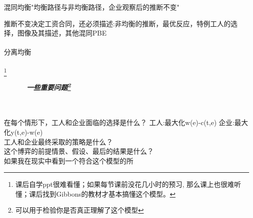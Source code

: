 \documentclass{article}
\begin{document}
混同均衡"均衡路径与非均衡路径，企业观察后的推断不变"

推断不变决定工资合同，还必须描述:非均衡的推断，最优反应，特例工人的选择，图像及其描述，其他混同PBE\\
\\分离均衡\\\\


\footnote{课后自学ppt很难看懂；如果每节课前没花几小时的预习,
那么课上也很难听懂；课后找到Gibbons的教材才基本搞懂这个模型。}

\begin{center}
    \textbf{\emph{一些重要问题\footnote{可以用于检验你是否真正理解了这个模型}}}\\\\
    \end{center}

在每个情形下，工人和企业面临的选择是什么？ 工人:最大化w(e)-c(t,e) 企业:最大化y(t,e)-w(e)\\
工人和企业最终采取的策略是什么？\\
这个博弈的前提情景、假设、最后的结果是什么？\\
如果我在现实中看到一个符合这个模型的所
\end{document}
